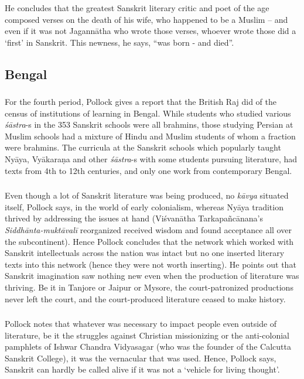 He concludes that the greatest Sanskrit literary critic and poet of the age composed verses on the death of his wife, who happened to be a Muslim – and even if it was not Jagannātha who wrote those verses, whoever wrote those did a ‘first’ in Sanskrit. This newness, he says, “was born - and died”.

\subsection{Bengal}
\vskip -5pt

\subsubsection{} For the fourth period, Pollock gives a report that the British Raj did of the census of institutions of learning in Bengal. While students who studied various {\sl śāstra}-s in the 353 Sanskrit schools were all brahmins, those studying Persian at Muslim schools had a mixture of Hindu and Muslim students of whom a fraction were brahmins. The curricula at the Sanskrit schools which popularly taught Nyāya, Vyākaraṇa and other {\sl śāstra}-s with some students pursuing literature, had texts from 4th to 12th centuries, and only one work from contemporary Bengal.

\subsubsection{} Even though a lot of Sanskrit literature was being produced, no {\sl kāvya} situated itself, Pollock says,  in the world of early colonialism, whereas Nyāya tradition thrived by addressing the issues at hand (Viśvanātha Tarkapañcānana’s {\sl Siddhānta-muktāvalī} reorganized received wisdom and found acceptance all over the subcontinent). Hence Pollock concludes that the network which worked with Sanskrit intellectuals across the nation was intact but no one inserted literary texts into this network (hence they were not worth inserting). He points out that Sanskrit imagination saw nothing new even when the production of literature was thriving. Be it in Tanjore or Jaipur or Mysore, the court-patronized productions never left the court, and the court-produced literature ceased to make history.

\subsubsection{} Pollock notes that whatever was necessary to impact people even outside of literature, be it the struggles against Christian missionizing or the anti-colonial pamphlets of Ishwar Chandra Vidyasagar (who was the founder of the Calcutta Sanskrit College), it was the vernacular that was used. Hence, Pollock says, Sanskrit can hardly be called alive if it was not a ‘vehicle for living thought’. 

